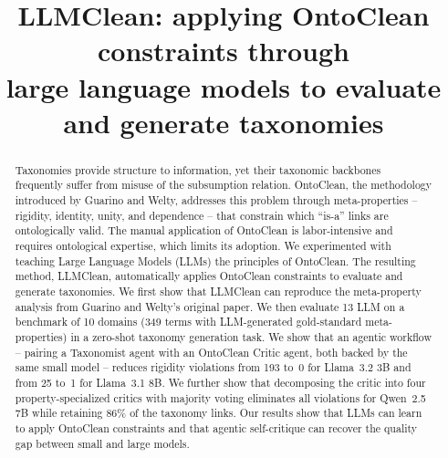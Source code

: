 \documentclass{IOS-Book-Article}
\def\hb{\hbox to 11.5 cm{}}
\begin{document}
\pagestyle{headings}
\def\thepage{}
\begin{frontmatter}              %


  \title{LLMClean: applying OntoClean constraints through\\
    large language models to evaluate and generate taxonomies}

  \markboth{}{February 2026\hb}

  \author[A]{  }%
  \author[B]{ }%
  
  \address[A]{}

  \begin{abstract}
    Taxonomies provide structure to information, yet their
    taxonomic backbones frequently suffer from misuse of the
    subsumption relation.  OntoClean, the methodology introduced
    by Guarino and Welty, addresses this problem through
    meta-properties -- rigidity, identity, unity, and dependence
    -- that constrain which ``is-a'' links are ontologically
    valid. The manual application of OntoClean is
    labor-intensive and requires ontological expertise, which
    limits its adoption.  We experimented with teaching Large
    Language Models (LLMs) the principles of OntoClean. The
    resulting method, LLMClean, automatically applies OntoClean
    constraints to evaluate and generate taxonomies.  We first
    show that LLMClean can reproduce the meta-property analysis
    from Guarino and Welty's original
    paper.
    We then evaluate 13 LLM on a benchmark of 10 domains (349
    terms with LLM-generated gold-standard meta-properties) in a
    zero-shot taxonomy generation task.  %
    We show that an agentic workflow -- pairing a Taxonomist
    agent with an OntoClean Critic agent, both backed by the
    same small model -- reduces rigidity violations from 193
    to~0 for Llama~3.2 3B and from 25 to~1 for Llama~3.1 8B.
    We further show that decomposing the critic into four
    property-specialized critics with majority voting eliminates
    all violations for Qwen~2.5 7B while retaining 86\% of the
    taxonomy links.  Our results show that LLMs can learn to
    apply OntoClean constraints and that agentic self-critique
    can recover the quality gap between small and large models.
  \end{abstract}


\end{frontmatter}
\end{document}
